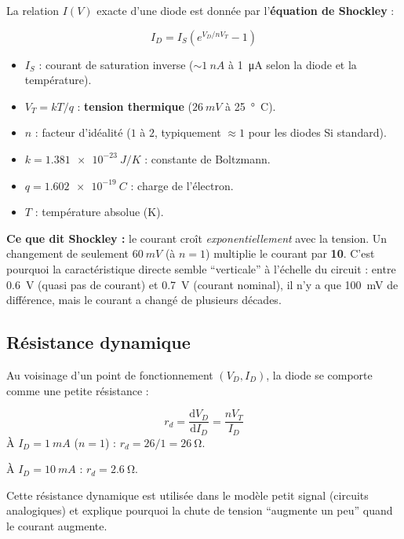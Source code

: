 \documentclass[12pt,a4paper,twoside]{book}
\begin{document}
La relation $I(V)$ exacte d'une diode est donnée par l'\textbf{équation de Shockley} :

\begin{formule}
\[
\boxed{I_D = I_S\left(e^{V_D / nV_T} - 1\right)}
\]
\begin{itemize}[nosep]
\item $I_S$ : courant de saturation inverse ($\sim\SI{1}{nA}$ à \SI{1}{\micro A} selon la diode et la température).
\item $V_T = kT/q$ : \textbf{tension thermique} ($\SI{26}{mV}$ à \SI{25}{°C}).
\item $n$ : facteur d'idéalité ($1$ à $2$, typiquement $\approx 1$ pour les diodes Si standard).
\item $k = \SI{1.381e-23}{J/K}$ : constante de Boltzmann.
\item $q = \SI{1.602e-19}{C}$ : charge de l'électron.
\item $T$ : température absolue (K).
\end{itemize}
\end{formule}

\begin{intuition}
\textbf{Ce que dit Shockley :} le courant croît \textit{exponentiellement} avec la tension. Un changement de seulement $\SI{60}{mV}$ (à $n = 1$) multiplie le courant par \textbf{10}. C'est pourquoi la caractéristique directe semble ``verticale'' à l'échelle du circuit : entre \SI{0.6}{V} (quasi pas de courant) et \SI{0.7}{V} (courant nominal), il n'y a que \SI{100}{mV} de différence, mais le courant a changé de plusieurs décades.
\end{intuition}

\subsection{Résistance dynamique}

Au voisinage d'un point de fonctionnement $(V_D, I_D)$, la diode se comporte comme une petite résistance :

\begin{formule}
\[
\boxed{r_d = \frac{\mathrm{d}V_D}{\mathrm{d}I_D} = \frac{nV_T}{I_D}}
\]
À $I_D = \SI{1}{mA}$ ($n = 1$) : $r_d = 26/1 = \SI{26}{\ohm}$.

À $I_D = \SI{10}{mA}$ : $r_d = \SI{2.6}{\ohm}$.
\end{formule}

Cette résistance dynamique est utilisée dans le modèle petit signal (circuits analogiques) et explique pourquoi la chute de tension ``augmente un peu'' quand le courant augmente.
\end{document}
